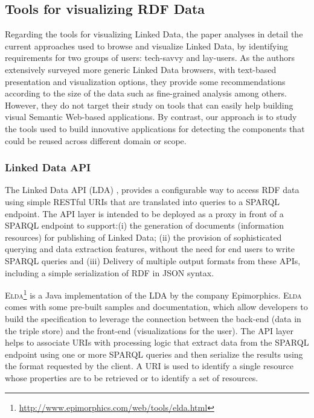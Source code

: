 \subsection{Tools for visualizing RDF Data}
\label{sec:vizrdf}
Regarding the tools for visualizing Linked Data,  the paper \cite{aba2011} analyses in detail the current approaches used to browse and visualize Linked Data, by identifying requirements for two groups of users: tech-savvy and lay-users. As the authors extensively surveyed more generic Linked Data browsers, with text-based presentation and visualization options, they provide some recommendations according to the size of the data such as fine-grained analysis among others. However, they do not target their study on tools that can easily help building visual Semantic Web-based applications. By contrast, our approach is to study the tools used to build innovative applications for detecting the components that could be reused across different domain or scope.


\subsubsection{Linked Data API}
The Linked Data API (LDA) \cite{ldapi}, provides a configurable way to access RDF data using simple RESTful URIs that are translated into queries to a SPARQL endpoint. The API layer is intended to be deployed as a proxy in front of a SPARQL endpoint to support:(i) the generation of documents (information resources) for publishing of Linked Data; (ii) the provision of sophisticated querying and data extraction features, without the need for end users to write SPARQL queries and (iii) Delivery of multiple output formats from these APIs, including a simple serialization of RDF in JSON syntax.

\textsc{Elda}\footnote{\url{http://www.epimorphics.com/web/tools/elda.html}} is a Java implementation of the LDA by the company Epimorphics. \textsc{Elda} comes with some pre-built samples and documentation, which allow developers to build the specification to leverage the connection between the back-end (data in the triple store) and the front-end (visualizations for the user). The API layer helps to associate URIs with processing logic that extract data from the SPARQL endpoint using one or more SPARQL queries and then serialize the results using the format requested by the client. A URI is used to identify a single resource whose properties are to be retrieved or to identify a set of resources.

